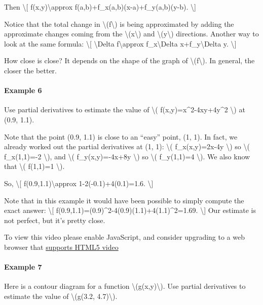 Then \textbackslash{}{[} f(x,y)\textbackslash{}approx
f(a,b)+f\_x(a,b)(x-a)+f\_y(a,b)(y-b). \textbackslash{}{]}

Notice that the total change in \textbackslash{}(f\textbackslash{}) is
being approximated by adding the approximate changes coming from the
\textbackslash{}(x\textbackslash{}) and
\textbackslash{}(y\textbackslash{}) directions. Another way to look at
the same formula: \textbackslash{}{[} \textbackslash{}Delta
f\textbackslash{}approx f\_x\textbackslash{}Delta
x+f\_y\textbackslash{}Delta y. \textbackslash{}{]}

How close is close? It depends on the shape of the graph of
\textbackslash{}(f\textbackslash{}). In general, the closer the better.

\hypertarget{example-6}{%
\paragraph{Example 6}\label{example-6}}

Use partial derivatives to estimate the value of \textbackslash{}(
f(x,y)=x\^{}2-4xy+4y\^{}2 \textbackslash{}) at (0.9, 1.1).

Note that the point (0.9, 1.1) is close to an ``easy'' point, (1, 1). In
fact, we already worked out the partial derivatives at (1, 1):
\textbackslash{}( f\_x(x,y)=2x-4y \textbackslash{}) so \textbackslash{}(
f\_x(1,1)=-2 \textbackslash{}), and \textbackslash{}( f\_y(x,y)=-4x+8y
\textbackslash{}) so \textbackslash{}( f\_y(1,1)=4 \textbackslash{}). We
also know that \textbackslash{}( f(1,1)=1 \textbackslash{}).

So, \textbackslash{}{[} f(0.9,1.1)\textbackslash{}approx
1-2(-0.1)+4(0.1)=1.6. \textbackslash{}{]}

Note that in this example it would have been possible to simply compute
the exact answer: \textbackslash{}{[}
f(0.9,1.1)=(0.9)\^{}2-4(0.9)(1.1)+4(1.1)\^{}2=1.69. \textbackslash{}{]}
Our estimate is not perfect, but it's pretty close.

To view this video please enable JavaScript, and consider upgrading to a
web browser that \href{http://videojs.com/html5-video-support/}{supports
HTML5 video}

\hypertarget{example-7}{%
\paragraph{Example 7}\label{example-7}}

Here is a contour diagram for a function
\textbackslash{}(g(x,y)\textbackslash{}). Use partial derivatives to
estimate the value of \textbackslash{}(g(3.2, 4.7)\textbackslash{}).

